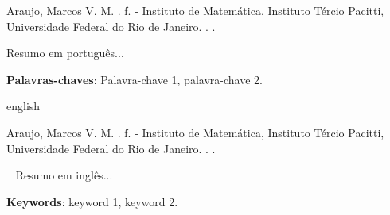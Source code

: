 
\setlength{\absparsep}{18pt} %
\begin{resumo}

	Araujo, Marcos V. M. \textbf{\imprimirtitulo}. \pageref{LastPage} f. \imprimirtipotrabalho - Instituto de Matemática, Instituto Tércio Pacitti, Universidade Federal do Rio de Janeiro. \imprimirlocal. \imprimirdata. 
    
Resumo em português...

 \textbf{Palavras-chaves}: Palavra-chave 1, palavra-chave 2.
\end{resumo}

\begin{resumo}[Abstract]
 \begin{otherlanguage*}{english}
   
   
   Araujo, Marcos V. M. \textbf{\imprimirtitulo}. \pageref{LastPage} f. \imprimirtipotrabalho - Instituto de Matemática, Instituto Tércio Pacitti, Universidade Federal do Rio de Janeiro. \imprimirlocal. \imprimirdata.

   Resumo em inglês...

   \vspace{\onelineskip}
 
   \noindent 
   
   \textbf{Keywords}: keyword 1, keyword 2.
 \end{otherlanguage*}
\end{resumo}
